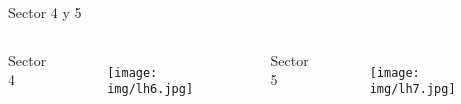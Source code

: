 \documentclass[11pt]{beamer}
\begin{document}
\begin{frame}{Sector 4 y 5}

	\begin{columns}[t]
	Sector 4
	\begin{figure}
		\texttt{[image: img/lh6.jpg]}
	\end{figure}
	
	Sector 5
	\begin{figure}
		\texttt{[image: img/lh7.jpg]}
	\end{figure}
\end{columns}
\end{frame}






%
%


\begin{frame}
\titlepage 
\end{frame}
\end{document}
